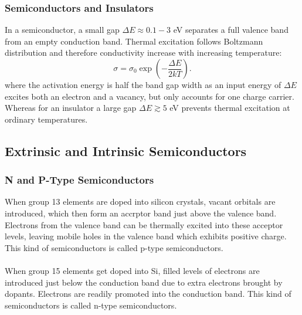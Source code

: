 \subsubsection{Semiconductors and Insulators}
In a semiconductor, a small gap $\Delta E\approx 0.1-3$ eV separates a full valence band from an empty conduction band. 
Thermal excitation follows Boltzmann distribution and therefore conductivity increase with increasing temperature:
\[
    \sigma = \sigma_0 \exp\left(-\frac{\Delta E}{2kT}\right).
\]
where the activation energy is half the band gap width 
as an input energy of $\Delta E$ excites both an electron and a vacancy, but only accounts for one charge carrier.
Whereas for an insulator a large gap $\Delta E \gtrsim 5$ eV prevents thermal excitation at ordinary temperatures.
%
\subsection{Extrinsic and Intrinsic Semiconductors}
%
\subsubsection{N and P-Type Semiconductors}
When group 13 elements are doped into silicon crystals, vacant orbitals are introduced, 
which then form an accrptor band just above the valence band. 
Electrons from the valence band can be thermally excited into these acceptor levels, 
leaving mobile holes in the valence band which exhibits positive charge.
This kind of semiconductors is called p-type semiconductors.\\ \\
%
When group 15 elements get doped into Si, filled levels of electrons are introduced just below the conduction band 
due to extra electrons brought by dopants. Electrons are readily promoted into the conduction band.
This kind of semiconductors is called n-type semiconductors.
%

